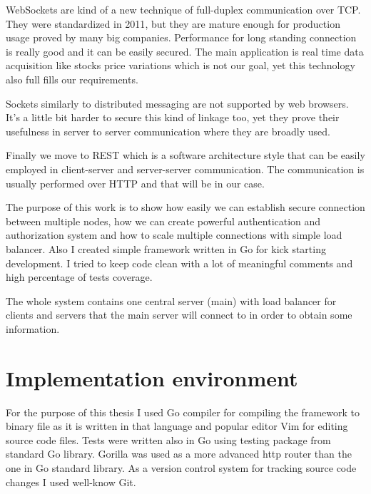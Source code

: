 WebSockets are kind of a new technique of full-duplex communication over TCP\@. They were standardized in 2011\cite{WebSockets-wiki}, but they are mature enough for production usage proved by many big companies. Performance for long standing connection is really good and it can be easily secured. The main application is real time data acquisition like stocks price variations which is not our goal, yet this technology also full fills our requirements.

Sockets similarly to distributed messaging are not supported by web browsers. It's a little bit harder to secure this kind of linkage too, yet they prove their usefulness in server to server communication where they are broadly used.

Finally we move to REST which is a software architecture style that can be easily employed in client-server and server-server communication. The communication is usually performed over HTTP and that will be in our case.

The purpose of this work is to show how easily we can establish secure connection between multiple nodes, how we can create powerful authentication and authorization system and how to scale multiple connections with simple load balancer. Also I created simple framework written in Go for kick starting development. I tried to keep code clean with a lot of meaningful comments and high percentage of tests coverage.

The whole system contains one central server (main) with load balancer for clients and servers that the main server will connect to in order to obtain some information.

\section{Implementation environment}
For the purpose of this thesis I used Go compiler for compiling the framework to binary file as it is written in that language and popular editor Vim for editing source code files. Tests were written also in Go using testing package from standard Go library. Gorilla was used as a more advanced http router than the one in Go standard library. As a version control system for tracking source code changes I used well-know Git.
